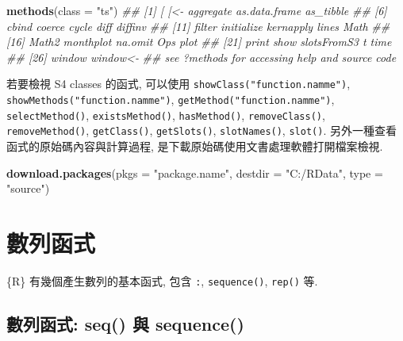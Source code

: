 \documentclass[
]{book}
\newenvironment{Shaded}{\begin{snugshade}}{\end{snugshade}}
\newcommand{\CommentTok}[1]{\textcolor[rgb]{0.56,0.35,0.01}{\textit{#1}}}
\newcommand{\DataTypeTok}[1]{\textcolor[rgb]{0.13,0.29,0.53}{#1}}
\newcommand{\KeywordTok}[1]{\textcolor[rgb]{0.13,0.29,0.53}{\textbf{#1}}}
\newcommand{\NormalTok}[1]{#1}
\newcommand{\StringTok}[1]{\textcolor[rgb]{0.31,0.60,0.02}{#1}}
\begin{document}
\begin{Shaded}
\begin{Highlighting}[]
\KeywordTok{methods}\NormalTok{(}\DataTypeTok{class =} \StringTok{"ts"}\NormalTok{)}
\CommentTok{\#\#  [1] [             [\textless{}{-}           aggregate     as.data.frame as\_tibble    }
\CommentTok{\#\#  [6] cbind         coerce        cycle         diff          diffinv      }
\CommentTok{\#\# [11] filter        initialize    kernapply     lines         Math         }
\CommentTok{\#\# [16] Math2         monthplot     na.omit       Ops           plot         }
\CommentTok{\#\# [21] print         show          slotsFromS3   t             time         }
\CommentTok{\#\# [26] window        window\textless{}{-}     }
\CommentTok{\#\# see \textquotesingle{}?methods\textquotesingle{} for accessing help and source code}
\end{Highlighting}
\end{Shaded}

若要檢視 S4 classes 的函式, 可以使用
\texttt{showClass("function.namme")},
\texttt{showMethods("function.namme")},
\texttt{getMethod("function.namme")},
\texttt{selectMethod()},
\texttt{existsMethod()},
\texttt{hasMethod()},
\texttt{removeClass()},
\texttt{removeMethod()},
\texttt{getClass()},
\texttt{getSlots()},
\texttt{slotNames()},
\texttt{slot()}.
另外一種查看函式的原始碼內容與計算過程,
是下載原始碼使用文書處理軟體打開檔案檢視.

\begin{Shaded}
\begin{Highlighting}[]
\KeywordTok{download.packages}\NormalTok{(}\DataTypeTok{pkgs =} \StringTok{"package.name"}\NormalTok{,}
                  \DataTypeTok{destdir =} \StringTok{"C:/RData"}\NormalTok{,}
                  \DataTypeTok{type =} \StringTok{"source"}\NormalTok{)}
\end{Highlighting}
\end{Shaded}

\hypertarget{ux6578ux5217ux51fdux5f0f}{%
\section{數列函式}\label{ux6578ux5217ux51fdux5f0f}}

\{R\} 有幾個產生數列的基本函式,
包含 \texttt{:}, \texttt{sequence()}, \texttt{rep()} 等.

\hypertarget{ux6578ux5217ux51fdux5f0f-seq-ux8207-sequence}{%
\subsection{數列函式: seq() 與 sequence()}\label{ux6578ux5217ux51fdux5f0f-seq-ux8207-sequence}}
\end{document}
